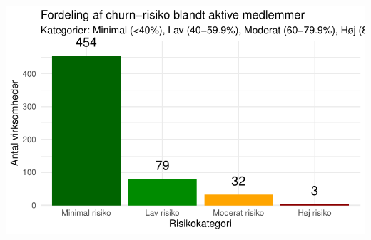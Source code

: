 \documentclass[
  11pt,
  letterpaper,
  DIV=11,
  numbers=noendperiod]{scrartcl}
\begin{document}
\includegraphics{Quarto_files/figure-pdf/unnamed-chunk-16-1.pdf}
\end{document}
